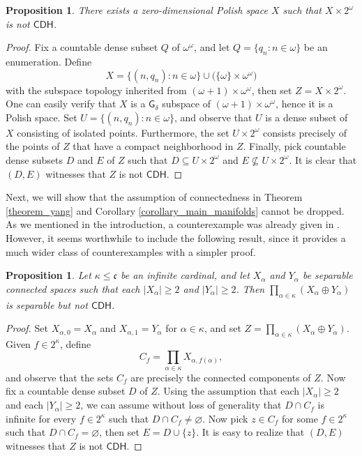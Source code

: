 \documentclass{amsart}
\theoremstyle{plain}
\newtheorem{proposition}[theorem]{Proposition}
\theoremstyle{definition}
\newcommand{\CDH}{\mathsf{CDH}}
\newcommand{\cccc}{\mathfrak{c}}
\begin{document}
\begin{proposition}\label{proposition_optimality_compactness}
There exists a zero-dimensional Polish space $X$ such that $X\times 2^\omega$ is not $\CDH$.
\end{proposition}
\begin{proof}
Fix a countable dense subset $Q$ of $\omega^\omega$, and let $Q=\{q_n:n\in\omega\}$ be an enumeration. Define
$$
X=\big\{(n,q_n):n\in\omega\big\}\cup\big(\{\omega\}\times\omega^\omega\big)
$$
with the subspace topology inherited from $(\omega+1)\times\omega^\omega$, then set $Z=X\times 2^\omega$. One can easily verify that $X$ is a $\mathsf{G}_\delta$ subspace of $(\omega+1)\times\omega^\omega$, hence it is a Polish space. Set $U=\{(n,q_n):n\in\omega\}$, and observe that $U$ is a dense subset of $X$ consisting of isolated points. Furthermore, the set $U\times 2^\omega$ consists precisely of the points of $Z$ that have a compact neighborhood in $Z$. Finally, pick countable dense subsets $D$ and $E$ of $Z$ such that $D\subseteq U\times 2^\omega$ and $E\nsubseteq U\times 2^\omega$. It is clear that $(D,E)$ witnesses that $Z$ is not $\CDH$.
\end{proof}

Next, we will show that the assumption of connectedness in Theorem \ref{theorem_yang} and Corollary \ref{corollary_main_manifolds} cannot be dropped. As we mentioned in the introduction, a counterexample was already given in \cite[Example 1]{yang}. However, it seems worthwhile to include the following result, since it provides a much wider class of counterexamples with a simpler proof.

\begin{proposition}\label{proposition_optimality_connectedness}
Let $\kappa\leq\cccc$ be an infinite cardinal, and let $X_\alpha$ and $Y_\alpha$ be separable connected spaces such that each $|X_\alpha|\geq 2$ and $|Y_\alpha|\geq 2$. Then $\prod_{\alpha\in\kappa}(X_\alpha\oplus Y_\alpha)$ is separable but not $\CDH$.
\end{proposition}
\begin{proof}
Set $X_{\alpha,0}=X_\alpha$ and $X_{\alpha,1}=Y_\alpha$ for $\alpha\in\kappa$, and set $Z=\prod_{\alpha\in\kappa}(X_\alpha\oplus Y_\alpha)$. Given $f\in 2^\kappa$, define
$$
C_f=\prod_{\alpha\in\kappa}X_{\alpha,f(\alpha)},
$$
and observe that the sets $C_f$ are precisely the connected components of $Z$. Now fix a countable dense subset $D$ of $Z$. Using the assumption that each $|X_\alpha|\geq 2$ and each $|Y_\alpha|\geq 2$, we can assume without loss of generality that $D\cap C_f$ is infinite for every $f\in 2^\kappa$ such that $D\cap C_f\neq\varnothing$. Now pick $z\in C_f$ for some $f\in 2^\kappa$ such that $D\cap C_f=\varnothing$, then set $E=D\cup\{z\}$. It is easy to realize that $(D,E)$ witnesses that $Z$ is not $\CDH$.
\end{proof}
\end{document}
